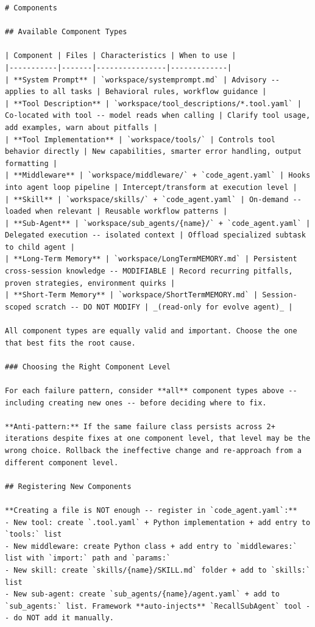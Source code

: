 \begin{tcolorbox}
\begin{lstlisting}
# Components

## Available Component Types

| Component | Files | Characteristics | When to use |
|-----------|-------|----------------|-------------|
| **System Prompt** | `workspace/systemprompt.md` | Advisory -- applies to all tasks | Behavioral rules, workflow guidance |
| **Tool Description** | `workspace/tool_descriptions/*.tool.yaml` | Co-located with tool -- model reads when calling | Clarify tool usage, add examples, warn about pitfalls |
| **Tool Implementation** | `workspace/tools/` | Controls tool behavior directly | New capabilities, smarter error handling, output formatting |
| **Middleware** | `workspace/middleware/` + `code_agent.yaml` | Hooks into agent loop pipeline | Intercept/transform at execution level |
| **Skill** | `workspace/skills/` + `code_agent.yaml` | On-demand -- loaded when relevant | Reusable workflow patterns |
| **Sub-Agent** | `workspace/sub_agents/{name}/` + `code_agent.yaml` | Delegated execution -- isolated context | Offload specialized subtask to child agent |
| **Long-Term Memory** | `workspace/LongTermMEMORY.md` | Persistent cross-session knowledge -- MODIFIABLE | Record recurring pitfalls, proven strategies, environment quirks |
| **Short-Term Memory** | `workspace/ShortTermMEMORY.md` | Session-scoped scratch -- DO NOT MODIFY | _(read-only for evolve agent)_ |

All component types are equally valid and important. Choose the one that best fits the root cause.

### Choosing the Right Component Level

For each failure pattern, consider **all** component types above -- including creating new ones -- before deciding where to fix.

**Anti-pattern:** If the same failure class persists across 2+ iterations despite fixes at one component level, that level may be the wrong choice. Rollback the ineffective change and re-approach from a different component level.

## Registering New Components

**Creating a file is NOT enough -- register in `code_agent.yaml`:**
- New tool: create `.tool.yaml` + Python implementation + add entry to `tools:` list
- New middleware: create Python class + add entry to `middlewares:` list with `import:` path and `params:`
- New skill: create `skills/{name}/SKILL.md` folder + add to `skills:` list
- New sub-agent: create `sub_agents/{name}/agent.yaml` + add to `sub_agents:` list. Framework **auto-injects** `RecallSubAgent` tool -- do NOT add it manually.


\end{lstlisting}
\end{tcolorbox}
